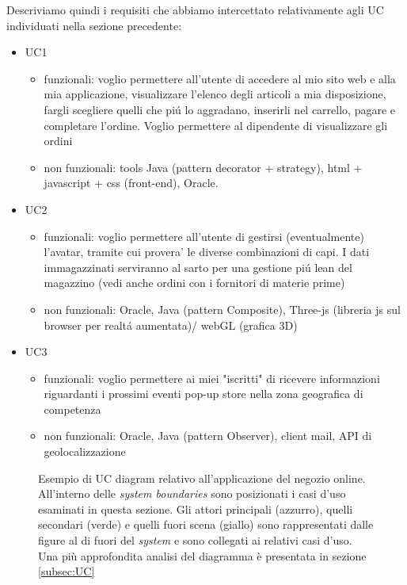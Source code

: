 \documentclass[12pt]{article}
\begin{document}
Descriviamo quindi i requisiti che abbiamo intercettato relativamente agli UC individuati nella sezione precedente: 
\begin{itemize}
	\item UC1
		\begin{itemize}
		\item funzionali: voglio permettere all'utente di accedere al mio sito web e alla mia applicazione, visualizzare l'elenco degli articoli a mia disposizione, fargli scegliere quelli che pi\'u lo aggradano, inserirli nel carrello, pagare e completare l'ordine. Voglio permettere al dipendente di visualizzare gli ordini 
		\item non funzionali: tools Java (pattern decorator + strategy), html + javascript + css (front-end), Oracle. 
		\end{itemize}
	\item UC2
		\begin{itemize}
		\item funzionali: voglio permettere all'utente di gestirsi (eventualmente) l'avatar, tramite cui provera' le diverse combinazioni di capi. I dati immagazzinati serviranno al sarto per una gestione pi\'u lean del magazzino (vedi anche ordini con i fornitori di materie prime)
		\item non funzionali: Oracle, Java (pattern Composite), Three-js (libreria js sul browser per realt\'a aumentata)/ webGL (grafica 3D)
		\end{itemize}
	\item UC3
		\begin{itemize}
		\item funzionali: voglio permettere ai miei "iscritti" di ricevere informazioni riguardanti i prossimi eventi pop-up store nella zona geografica di competenza 
		\item non funzionali: Oracle, Java (pattern Observer), client mail, API di geolocalizzazione
		\end{itemize}
\end{itemize}

\vspace{0.5cm}
\begin{figure}[t]
  \centering
   \makebox[\textwidth][c]{}
   \vspace{0.5cm}
  \caption{\small Esempio di UC diagram relativo all'applicazione del negozio online. All'interno delle {\em system boundaries} sono posizionati i casi d'uso esaminati in questa sezione. Gli attori principali (azzurro), quelli secondari (verde) e quelli fuori scena (giallo) sono rappresentati dalle figure al di fuori del {\em system} e sono collegati ai relativi casi d'uso. Una più approfondita analisi del diagramma è presentata in sezione \ref{subsec:UC}}
  \label{fig:UC_diagram}
\end{figure}
\end{document}
